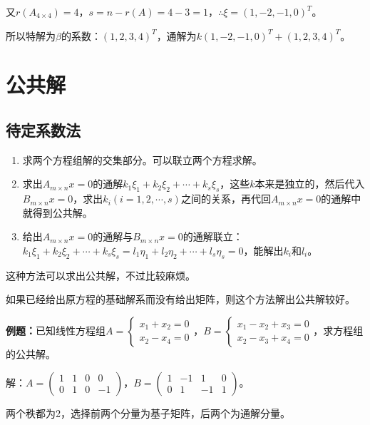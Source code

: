 \documentclass[UTF8, 12pt]{ctexart}
\begin{document}
又$r(A_{4\times4})=4$，$s=n-r(A)=4-3=1$，$\therefore\xi=(1,-2,-1,0)^T$。

所以特解为$\beta$的系数：$(1,2,3,4)^T$，通解为$k(1,-2,-1,0)^T+(1,2,3,4)^T$。

\section{公共解}

\subsection{待定系数法}

\begin{enumerate}
    \item 求两个方程组解的交集部分。可以联立两个方程求解。
    \item 求出$A_{m\times n}x=0$的通解$k_1\xi_1+k_2\xi_2+\cdots+k_s\xi_s$，这些$k$本来是独立的，然后代入$B_{m\times n}x=0$，求出$k_i(i=1,2,\cdots,s)$之间的关系，再代回$A_{m\times n}x=0$的通解中就得到公共解。
    \item 给出$A_{m\times n}x=0$的通解与$B_{m\times n}x=0$的通解联立：$k_1\xi_1+k_2\xi_2+\cdots+k_s\xi_s=l_1\eta_1+l_2\eta_2+\cdots+l_s\eta_s=0$，能解出$k_i$和$l_i$。
\end{enumerate}

这种方法可以求出公共解，不过比较麻烦。

如果已经给出原方程的基础解系而没有给出矩阵，则这个方法解出公共解较好。

\textbf{例题：}已知线性方程组$A=\left\{\begin{array}{l}
    x_1+x_2=0 \\
    x_2-x_4=0
\end{array}\right.$，$B=\left\{\begin{array}{l}
    x_1-x_2+x_3=0 \\
    x_2-x_3+x_4=0
\end{array}\right.$，求方程组的公共解。

解：$A=\left(\begin{array}{cccc}
    1 & 1 & 0 & 0 \\
    0 & 1 & 0 & -1
\end{array}\right)$，$B=\left(\begin{array}{cccc}
    1 & -1 & 1 & 0 \\
    0 & 1 & -1 & 1
\end{array}\right)$。\medskip

两个秩都为2，选择前两个分量为基子矩阵，后两个为通解分量。
\end{document}
